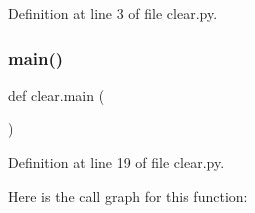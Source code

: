 Definition at line 3 of file clear.\+py.

\mbox{\label{namespaceclear_a7c020f5885bae20fb99d2120b41869e9}} 
\subsubsection{\texorpdfstring{main()}{main()}}
{\footnotesize\ttfamily def clear.\+main (\begin{DoxyParamCaption}{ }\end{DoxyParamCaption})}



Definition at line 19 of file clear.\+py.

Here is the call graph for this function\+:
